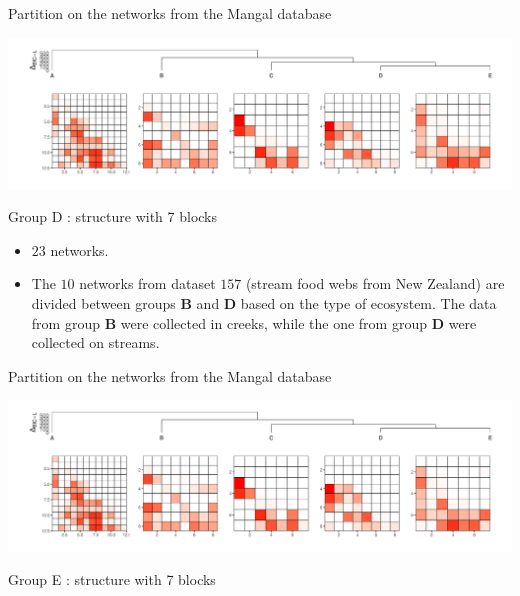 \documentclass[compress,10pt]{beamer}
\begin{document}
\begin{frame}{Partition on the networks from the Mangal database}

\includegraphics[width=\hsize]{plots/rmangal_pi_newpen_dend_meso}
    

\alert{Group D} : structure with 7 blocks 
\begin{itemize}
 \item  $23$ networks. 
 \item The $10$ networks from dataset $157$ (stream food webs from New Zealand) are divided between groups \textbf{B} and \textbf{D} based on the type of ecosystem. 
 The data from group \textbf{B} were collected in creeks, while the one from group \textbf{D} were collected on streams. 
\end{itemize}
\end{frame}


\begin{frame}{Partition on the networks from the Mangal database}

\includegraphics[width=\hsize]{plots/rmangal_pi_newpen_dend_meso}
   
\alert{Group E} : structure with 7 blocks 

   
\end{frame}
\end{document}

